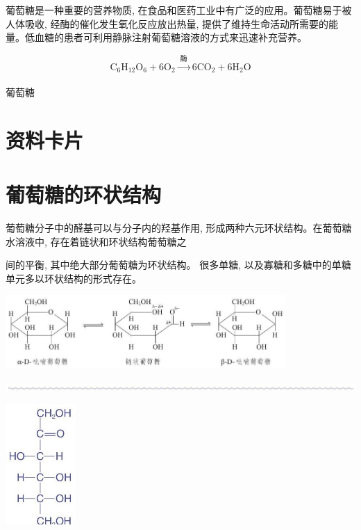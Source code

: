 \documentclass[10pt]{article}
\begin{document}
葡萄糖是一种重要的营养物质, 在食品和医药工业中有广泛的应用。葡萄糖易于被人体吸收, 经酶的催化发生氧化反应放出热量, 提供了维持生命活动所需要的能量。低血糖的患者可利用静脉注射葡萄糖溶液的方式来迅速补充营养。

\[
{\mathrm{C}}_{6}{\mathrm{H}}_{12}{\mathrm{O}}_{6} + 6{\mathrm{O}}_{2}\xrightarrow[]{\text{ 酶 }}6{\mathrm{{CO}}}_{2} + 6{\mathrm{H}}_{2}\mathrm{O}
\]

葡萄糖

\section*{资料卡片}

\section*{葡萄糖的环状结构}

葡萄糖分子中的醛基可以与分子内的羟基作用, 形成两种六元环状结构。在葡萄糖水溶液中, 存在着链状和环状结构葡萄糖之

间的平衡, 其中绝大部分葡萄糖为环状结构。 很多单糖, 以及寡糖和多糖中的单糖单元多以环状结构的形式存在。

\begin{center}
\includegraphics[max width=0.8\textwidth]{images/0190efc5-b58a-7c43-bfb0-e0a030df9cfd_109_226907.jpg}
\end{center}

\begin{center}
\includegraphics[max width=1.0\textwidth]{images/0190efc5-b58a-7c43-bfb0-e0a030df9cfd_109_859932.jpg}
\end{center}

\begin{center}
\includegraphics[max width=0.2\textwidth]{images/0190efc5-b58a-7c43-bfb0-e0a030df9cfd_109_687927.jpg}
\end{center}
\end{document}
